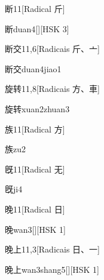 \begin{entry}{断}{11}[Radical ⽄]
  \begin{phonetics}{断}{duan4}[][HSK 3]
  \end{phonetics}
\end{entry}

\begin{entry}{断交}{11,6}[Radicais ⽄、⼇]
  \begin{phonetics}{断交}{duan4jiao1}
  \end{phonetics}
\end{entry}

\begin{entry}{旋转}{11,8}[Radicais ⽅、⾞]
  \begin{phonetics}{旋转}{xuan2zhuan3}
  \end{phonetics}
\end{entry}

\begin{entry}{族}{11}[Radical ⽅]
  \begin{phonetics}{族}{zu2}
  \end{phonetics}
\end{entry}

\begin{entry}{旣}{11}[Radical ⽆]
  \begin{phonetics}{旣}{ji4}
  \end{phonetics}
\end{entry}

\begin{entry}{晚}{11}[Radical ⽇]
  \begin{phonetics}{晚}{wan3}[][HSK 1]
  \end{phonetics}
\end{entry}

\begin{entry}{晚上}{11,3}[Radicais ⽇、⼀]
  \begin{phonetics}{晚上}{wan3shang5}[][HSK 1]
  \end{phonetics}
\end{entry}

